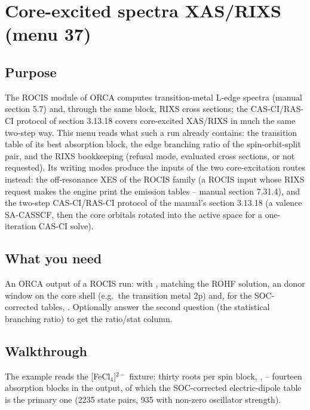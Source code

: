 \chapter{Core-excited spectra XAS/RIXS (menu 37)}
\label{ch:menu37}

\section{Purpose}

The ROCIS module of ORCA computes transition-metal L-edge spectra (manual
section 5.7) and, through the same block, RIXS cross sections; the
CAS-CI/RAS-CI protocol of section 3.13.18 covers core-excited XAS/RIXS in
much the same two-step way.  This menu reads what such a run already
contains: the transition table of its best absorption block, the edge
branching ratio of the spin-orbit-split pair, and the RIXS bookkeeping
(refusal mode, evaluated cross sections, or not requested).  Its writing
modes produce the inputs of the two core-excitation routes instead: the
off-resonance XES of the ROCIS family (a ROCIS input whose RIXS request
makes the engine print the emission tables -- manual section 7.31.4), and
the two-step CAS-CI/RAS-CI protocol of the manual's section 3.13.18 (a
valence SA-CASSCF, then the core orbitals rotated into the active space
for a one-iteration CAS-CI solve).

\section{What you need}

An ORCA output of a ROCIS run:  with ,
 matching the ROHF solution, an  donor
window on the core shell (e.g.\ the transition metal 2p) and, for the
SOC-corrected tables, .  Optionally answer the second
question (the statistical branching ratio) to get the ratio/stat column.

\section{Walkthrough}

The example reads the [FeCl$_4$]$^{2-}$ fixture: thirty roots per spin
block, ,  -- fourteen absorption blocks in
the output, of which the SOC-corrected electric-dipole table is the primary
one (2235 state pairs, 935 with non-zero oscillator strength).

